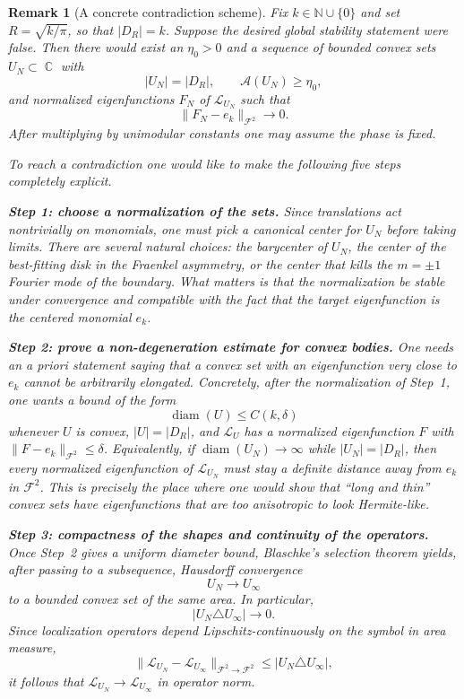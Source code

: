 \documentclass[a4paper,11pt,reqno]{amsart}
\newtheorem{remark}{Remark}[section]
\DeclareMathOperator{\C}{\mathbb{C}}
\newcommand{\N}{\mathbb{N}}
\begin{document}
\begin{remark}[A concrete contradiction scheme]
Fix $k\in\N\cup\{0\}$ and set $R=\sqrt{k/\pi}$, so that $|D_R|=k$.
Suppose the desired global stability statement were false. Then there would exist
an $\eta_0>0$ and a sequence of bounded convex sets $U_N\subset\C$ with
\[
|U_N|=|D_R|,
\qquad
\mathcal A(U_N)\ge \eta_0,
\]
and normalized eigenfunctions $F_N$ of $\mathcal L_{U_N}$ such that
\[
\|F_N-e_k\|_{\mathcal F^2}\to 0.
\]
After multiplying by unimodular constants one may assume the phase is fixed.

To reach a contradiction one would like to make the following five steps
completely explicit.

\smallskip
\textbf{Step 1: choose a normalization of the sets.}
Since translations act nontrivially on monomials, one must pick a canonical
center for $U_N$ before taking limits. There are several natural choices:
the barycenter of $U_N$, the center of the best-fitting disk in the Fraenkel
asymmetry, or the center that kills the $m=\pm1$ Fourier mode of the boundary.
What matters is that the normalization be stable under convergence and compatible
with the fact that the target eigenfunction is the \emph{centered} monomial $e_k$.

\smallskip
\textbf{Step 2: prove a non-degeneration estimate for convex bodies.}
One needs an a priori statement saying that a convex set with an eigenfunction
very close to $e_k$ cannot be arbitrarily elongated. Concretely, after the
normalization of Step~1, one wants a bound of the form
\[
\operatorname{diam}(U)\le C(k,\delta)
\]
whenever $U$ is convex, $|U|=|D_R|$, and $\mathcal L_U$ has a normalized
eigenfunction $F$ with $\|F-e_k\|_{\mathcal F^2}\le \delta$.
Equivalently, if $\operatorname{diam}(U_N)\to\infty$ while $|U_N|=|D_R|$, then
every normalized eigenfunction of $\mathcal L_{U_N}$ must stay a definite
distance away from $e_k$ in $\mathcal F^2$. This is precisely the place where
one would show that ``long and thin'' convex sets have eigenfunctions that are
too anisotropic to look Hermite-like.

\smallskip
\textbf{Step 3: compactness of the shapes and continuity of the operators.}
Once Step~2 gives a uniform diameter bound, Blaschke's selection theorem yields,
after passing to a subsequence, Hausdorff convergence
\[
U_N\to U_\infty
\]
to a bounded convex set of the same area. In particular,
\[
|U_N\triangle U_\infty|\to 0.
\]
Since localization operators depend Lipschitz-continuously on the symbol in
area measure,
\[
\|\mathcal L_{U_N}-\mathcal L_{U_\infty}\|_{\mathcal F^2\to\mathcal F^2}
\le |U_N\triangle U_\infty|,
\]
it follows that $\mathcal L_{U_N}\to\mathcal L_{U_\infty}$ in operator norm.


\end{remark}
\end{document}
